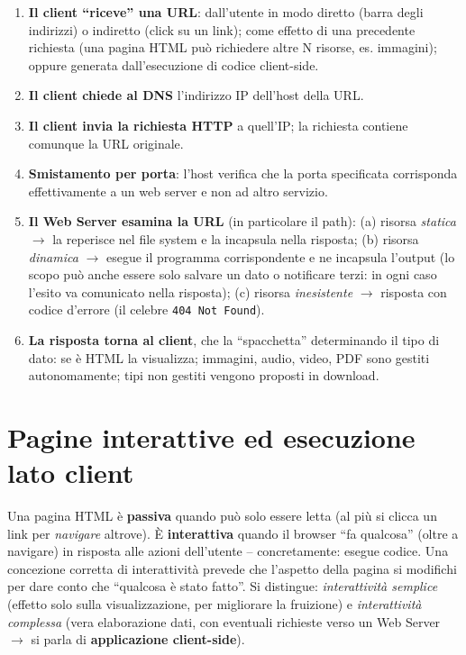 \begin{importante}
\begin{enumerate}
  \item \textbf{Il client ``riceve'' una URL}: dall'utente in modo diretto (barra degli
        indirizzi) o indiretto (click su un link); come effetto di una precedente richiesta
        (una pagina HTML pu\`o richiedere altre N risorse, es. immagini); oppure generata
        dall'esecuzione di codice client-side.
  \item \textbf{Il client chiede al DNS} l'indirizzo IP dell'host della URL.
  \item \textbf{Il client invia la richiesta HTTP} a quell'IP; la richiesta contiene comunque
        la URL originale.
  \item \textbf{Smistamento per porta}: l'host verifica che la porta specificata corrisponda
        effettivamente a un web server e non ad altro servizio.
  \item \textbf{Il Web Server esamina la URL} (in particolare il path):
        (a) risorsa \emph{statica} $\rightarrow$ la reperisce nel file system e la incapsula
        nella risposta; (b) risorsa \emph{dinamica} $\rightarrow$ esegue il programma
        corrispondente e ne incapsula l'output (lo scopo pu\`o anche essere solo salvare un
        dato o notificare terzi: in ogni caso l'esito va comunicato nella risposta);
        (c) risorsa \emph{inesistente} $\rightarrow$ risposta con codice d'errore
        (il celebre \texttt{404 Not Found}).
  \item \textbf{La risposta torna al client}, che la ``spacchetta'' determinando il tipo di
        dato: se \`e HTML la visualizza; immagini, audio, video, PDF sono gestiti
        autonomamente; tipi non gestiti vengono proposti in download.
\end{enumerate}
\end{importante}

\section{Pagine interattive ed esecuzione lato client}

Una pagina HTML \`e \textbf{passiva} quando pu\`o solo essere letta (al pi\`u si clicca un
link per \emph{navigare} altrove). \`E \textbf{interattiva} quando il browser ``fa qualcosa''
(oltre a navigare) in risposta alle azioni dell'utente -- concretamente: esegue codice.
Una concezione corretta di interattivit\`a prevede che l'aspetto della pagina si modifichi
per dare conto che ``qualcosa \`e stato fatto''. Si distingue:
\emph{interattivit\`a semplice} (effetto solo sulla visualizzazione, per migliorare la
fruizione) e \emph{interattivit\`a complessa} (vera elaborazione dati, con eventuali richieste
verso un Web Server $\rightarrow$ si parla di \textbf{applicazione client-side}).

